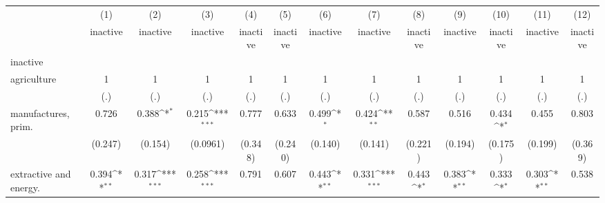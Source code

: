 {
\def\sym#1{\ifmmode^{#1}\else\(^{#1}\)\fi}
\begin{tabular}{l*{12}{c}}
\hline\hline
                    &\multicolumn{1}{c}{(1)}&\multicolumn{1}{c}{(2)}&\multicolumn{1}{c}{(3)}&\multicolumn{1}{c}{(4)}&\multicolumn{1}{c}{(5)}&\multicolumn{1}{c}{(6)}&\multicolumn{1}{c}{(7)}&\multicolumn{1}{c}{(8)}&\multicolumn{1}{c}{(9)}&\multicolumn{1}{c}{(10)}&\multicolumn{1}{c}{(11)}&\multicolumn{1}{c}{(12)}\\
                    &\multicolumn{1}{c}{inactive}&\multicolumn{1}{c}{inactive}&\multicolumn{1}{c}{inactive}&\multicolumn{1}{c}{inactive}&\multicolumn{1}{c}{inactive}&\multicolumn{1}{c}{inactive}&\multicolumn{1}{c}{inactive}&\multicolumn{1}{c}{inactive}&\multicolumn{1}{c}{inactive}&\multicolumn{1}{c}{inactive}&\multicolumn{1}{c}{inactive}&\multicolumn{1}{c}{inactive}\\
\hline
inactive            &                     &                     &                     &                     &                     &                     &                     &                     &                     &                     &                     &                     \\
agriculture         &           1         &           1         &           1         &           1         &           1         &           1         &           1         &           1         &           1         &           1         &           1         &           1         \\
                    &         (.)         &         (.)         &         (.)         &         (.)         &         (.)         &         (.)         &         (.)         &         (.)         &         (.)         &         (.)         &         (.)         &         (.)         \\
[1em]
manufactures, prim. &       0.726         &       0.388\sym{*}  &       0.215\sym{***}&       0.777         &       0.633         &       0.499\sym{*}  &       0.424\sym{**} &       0.587         &       0.516         &       0.434\sym{*}  &       0.455         &       0.803         \\
                    &     (0.247)         &     (0.154)         &    (0.0961)         &     (0.348)         &     (0.240)         &     (0.140)         &     (0.141)         &     (0.221)         &     (0.194)         &     (0.175)         &     (0.199)         &     (0.369)         \\
[1em]
extractive and energy.&       0.394\sym{**} &       0.317\sym{***}&       0.258\sym{***}&       0.791         &       0.607         &       0.443\sym{**} &       0.331\sym{***}&       0.443\sym{*}  &       0.383\sym{**} &       0.333\sym{*}  &       0.303\sym{**} &       0.538         \\

\end{tabular}}
